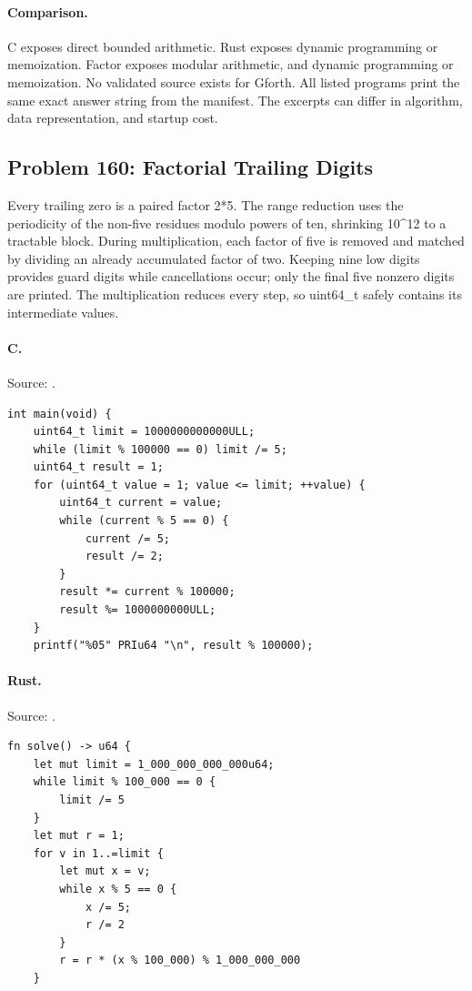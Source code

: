 \paragraph{Comparison.}
C exposes direct bounded arithmetic. Rust exposes dynamic programming or memoization. Factor exposes modular arithmetic, and dynamic programming or memoization.
No validated source exists for Gforth.
All listed programs print the same exact answer string from the manifest. The excerpts can differ in algorithm, data representation, and startup cost.

\subsection{Problem 160: Factorial Trailing Digits}
\label{walkthrough:p160}
Every trailing zero is a paired factor 2*5. The range reduction uses the periodicity of the non-five residues modulo powers of ten, shrinking 10\textasciicircum{}12 to a tractable block. During multiplication, each factor of five is removed and matched by dividing an already accumulated factor of two. Keeping nine low digits provides guard digits while cancellations occur; only the final five nonzero digits are printed. The multiplication reduces every step, so uint64\_t safely contains its intermediate values.

\paragraph{C.} Source: .
\begin{lstlisting}
int main(void) {
    uint64_t limit = 1000000000000ULL;
    while (limit % 100000 == 0) limit /= 5;
    uint64_t result = 1;
    for (uint64_t value = 1; value <= limit; ++value) {
        uint64_t current = value;
        while (current % 5 == 0) {
            current /= 5;
            result /= 2;
        }
        result *= current % 100000;
        result %= 1000000000ULL;
    }
    printf("%05" PRIu64 "\n", result % 100000);
\end{lstlisting}

\paragraph{Rust.} Source: .
\begin{lstlisting}
fn solve() -> u64 {
    let mut limit = 1_000_000_000_000u64;
    while limit % 100_000 == 0 {
        limit /= 5
    }
    let mut r = 1;
    for v in 1..=limit {
        let mut x = v;
        while x % 5 == 0 {
            x /= 5;
            r /= 2
        }
        r = r * (x % 100_000) % 1_000_000_000
    }
\end{lstlisting}

